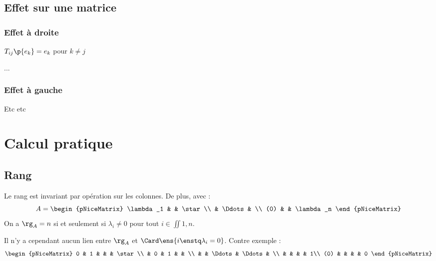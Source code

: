 \documentclass[a4paper,french,bookmarks]{book}
\begin{document}
    \subsection{Effet sur une matrice}
    
    \subsubsection{Effet à droite}
    
    \begin{enumerate}
        \itt $T_{ij}\p{e_k} = e_k$ pour $k \neq j$
        
        \itt ...
    \end{enumerate}
    
    \subsubsection{Effet à gauche}
    
     Etc etc
    
    \section{Calcul pratique}
    
    \subsection{Rang}
    
    Le rang est invariant par opération sur les colonnes. De plus, avec :
    \[ A = \begin{pNiceMatrix}
        \lambda_1 & & \star\\
        & \Ddots & \\
        (0) & & \lambda_n
    \end{pNiceMatrix}\]
    On a $\rg_{A} = n$ si et seulement si $\lambda_i \neq 0$ pour tout $i \in \iint{1, n}$.
    
    Il n'y a cependant aucun lien entre $\rg_{A}$ et $\Card \ens{i \enstq \lambda_i = 0}$. Contre exemple :
    \[ \begin{pNiceMatrix}
        0 & 1 &   &  & \star\\
          & 0 & 1 &  & \\
          &   & \Ddots & \Ddots & \\
          &   &   &  & 1\\
        (0)  &   &   &  & 0
    \end{pNiceMatrix}\]
    
\end{document}
